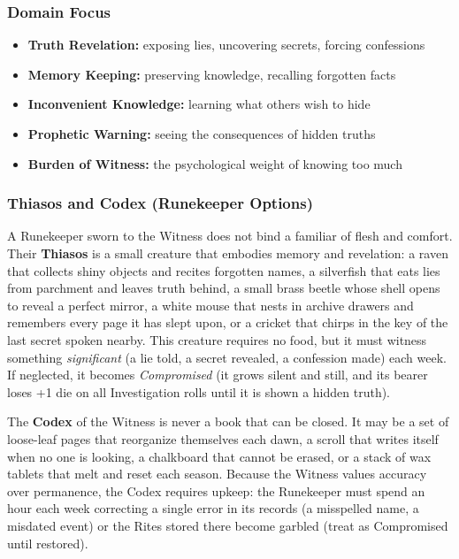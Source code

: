 \subsubsection*{Domain Focus}
\begin{itemize}
  \item \textbf{Truth Revelation:} exposing lies, uncovering secrets, forcing confessions
  \item \textbf{Memory Keeping:} preserving knowledge, recalling forgotten facts
  \item \textbf{Inconvenient Knowledge:} learning what others wish to hide
  \item \textbf{Prophetic Warning:} seeing the consequences of hidden truths
  \item \textbf{Burden of Witness:} the psychological weight of knowing too much
\end{itemize}

\subsubsection*{Thiasos and Codex (Runekeeper Options)}

A Runekeeper sworn to the Witness does not bind a familiar of flesh and comfort. Their \textbf{Thiasos} is a small creature that embodies memory and revelation: a raven that collects shiny objects and recites forgotten names, a silverfish that eats lies from parchment and leaves truth behind, a small brass beetle whose shell opens to reveal a perfect mirror, a white mouse that nests in archive drawers and remembers every page it has slept upon, or a cricket that chirps in the key of the last secret spoken nearby. This creature requires no food, but it must witness something \textit{significant} (a lie told, a secret revealed, a confession made) each week. If neglected, it becomes \textit{Compromised} (it grows silent and still, and its bearer loses +1 die on all Investigation rolls until it is shown a hidden truth).

The \textbf{Codex} of the Witness is never a book that can be closed. It may be a set of loose-leaf pages that reorganize themselves each dawn, a scroll that writes itself when no one is looking, a chalkboard that cannot be erased, or a stack of wax tablets that melt and reset each season. Because the Witness values accuracy over permanence, the Codex requires upkeep: the Runekeeper must spend an hour each week correcting a single error in its records (a misspelled name, a misdated event) or the Rites stored there become garbled (treat as Compromised until restored).

